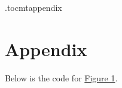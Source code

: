 \newpage
\appendix*
\etocdepthtag.toc{mtappendix}
\newpage

\chapter{Appendix}
Below is the code for \hyperlink{fig:discrete-gauss}{Figure 1}.
\label{app:code}


